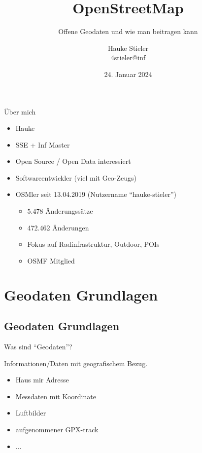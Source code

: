 \documentclass{beamer}
\title{OpenStreetMap}
\subtitle{Offene Geodaten und wie man beitragen kann}
\author[Hauke Stieler -- 4stieler@inf]{Hauke Stieler\\4stieler@inf}
\date{24. Januar 2024}
\begin{document}
	{
		\maketitle
		\addtocounter{page}{-1}
	}
	
	\begin{frame}{Über mich}
		\begin{itemize}
			\item Hauke
			\item SSE + Inf Master
			\pause
			\item Open Source / Open Data interessiert
			\item Softwareentwickler (viel mit Geo-Zeugs)
			\pause
			\item OSMler seit 13.04.2019 (Nutzername \enquote{hauke-stieler})
			\begin{itemize}
				\item 5.478 Änderungssätze
				\item 472.462 Änderungen
				\item Fokus auf Radinfrastruktur, Outdoor, POIs
				\item OSMF Mitglied
			\end{itemize}
		\end{itemize}
	\end{frame}
	
	\begin{frame}
		\tableofcontents
	\end{frame}
	
	\section{Geodaten Grundlagen}
	
		\subsection{Geodaten Grundlagen}
	
		\begin{frame}{Was sind \enquote{Geodaten}?}
			\begin{definition}
				Informationen/Daten mit geografischem Bezug.
			\end{definition}
			\begin{itemize}
				\item Haus mir Adresse\pause
				\item Messdaten mit Koordinate\pause
				\item Luftbilder\pause
				\item aufgenommener GPX-track\pause
				\item ...
			\end{itemize}
		\end{frame}
		
\end{document}
